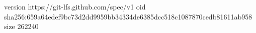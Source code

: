 version https://git-lfs.github.com/spec/v1
oid sha256:659a64edef9bc73d2dd9959bb34334de6385dcc518c1087870cedb81611ab958
size 262240
